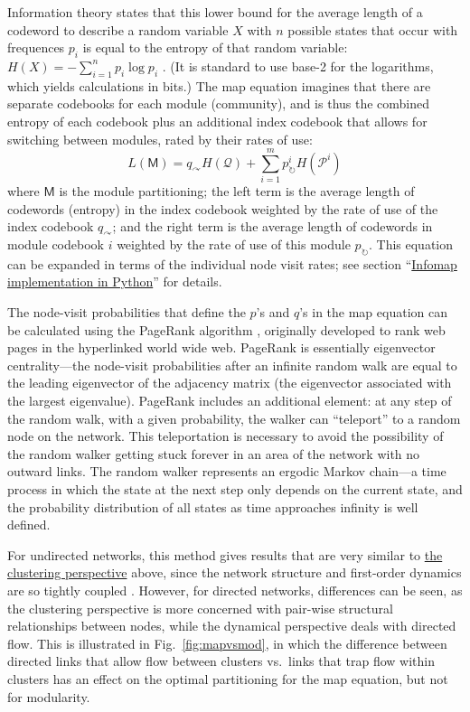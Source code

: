 Information theory states that this lower bound for the average length
of a codeword to describe a random variable \(X\) with \(n\) possible
states that occur with frequences \(p_i\) is equal to the entropy of
that random variable: \(H(X) = -\sum_{i=1}^{n}{p_i\log{p_i}}\)
\autocite{cover_elements_2012}. (It is standard to use base-2 for the
logarithms, which yields calculations in bits.) The map equation
imagines that there are separate codebooks for each module (community),
and is thus the combined entropy of each codebook plus an additional
index codebook that allows for switching between modules, rated by their
rates of use:
\[L(\mathsf{M}) = q_{\curvearrowright} H(\mathcal{Q}) + \sum_{i=1}^{m}{p_{\circlearrowright}^{i} H(\mathcal{P}^i)}\]
where \(\mathsf{M}\) is the module partitioning; the left term is the
average length of codewords (entropy) in the index codebook weighted by
the rate of use of the index codebook \(q_{\curvearrowright}\); and the
right term is the average length of codewords in module codebook \(i\)
weighted by the rate of use of this module \(p_{\circlearrowright}\).
This equation can be expanded in terms of the individual node visit
rates; see section ``\protect\hyperlink{pyinfomap}{Infomap
implementation in Python}'' for details.

The node-visit probabilities that define the \(p\)'s and \(q\)'s in the
map equation can be calculated using the PageRank algorithm
\autocite{page_pagerank_1999}, originally developed to rank web pages in
the hyperlinked world wide web. PageRank is essentially eigenvector
centrality---the node-visit probabilities after an infinite random walk
are equal to the leading eigenvector of the adjacency matrix (the
eigenvector associated with the largest eigenvalue). PageRank includes
an additional element: at any step of the random walk, with a given
probability, the walker can ``teleport'' to a random node on the
network. This teleportation is necessary to avoid the possibility of the
random walker getting stuck forever in an area of the network with no
outward links. The random walker represents an ergodic Markov chain---a
time process in which the state at the next step only depends on the
current state, and the probability distribution of all states as time
approaches infinity is well defined.

For undirected networks, this method gives results that are very similar
to \protect\hyperlink{the-clustering-perspective}{the clustering
perspective} above, since the network structure and first-order dynamics
are so tightly coupled \autocite{schaub_many_2017}. However, for
directed networks, differences can be seen, as the clustering
perspective is more concerned with pair-wise structural relationships
between nodes, while the dynamical perspective deals with directed flow.
This is illustrated in Fig.~\ref{fig:mapvsmod}, in which the difference
between directed links that allow flow between clusters vs.~links that
trap flow within clusters has an effect on the optimal partitioning for
the map equation, but not for modularity.

